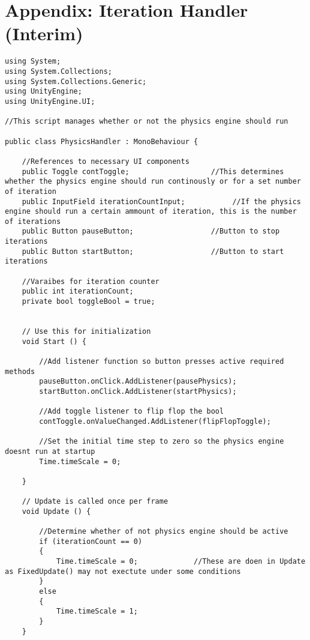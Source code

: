\section{Appendix: Iteration Handler (Interim)}

\begin{mdframed}[linecolor=black, topline=true, bottomline=true,
  leftline=false, rightline=false]
\begin{verbatim}
using System;
using System.Collections;
using System.Collections.Generic;
using UnityEngine;
using UnityEngine.UI;

//This script manages whether or not the physics engine should run

public class PhysicsHandler : MonoBehaviour {

    //References to necessary UI components 
    public Toggle contToggle;                   //This determines whether the physics engine should run continously or for a set number of iteration
    public InputField iterationCountInput;           //If the physics engine should run a certain ammount of iteration, this is the number of iterations
    public Button pauseButton;                  //Button to stop iterations
    public Button startButton;                  //Button to start iterations

    //Varaibes for iteration counter
    public int iterationCount;
    private bool toggleBool = true;


	// Use this for initialization
	void Start () {

        //Add listener function so button presses active required methods
        pauseButton.onClick.AddListener(pausePhysics);
        startButton.onClick.AddListener(startPhysics);

        //Add toggle listener to flip flop the bool
        contToggle.onValueChanged.AddListener(flipFlopToggle);

        //Set the initial time step to zero so the physics engine doesnt run at startup
        Time.timeScale = 0;

	}
	
	// Update is called once per frame
	void Update () {
		
        //Determine whether of not physics engine should be active
        if (iterationCount == 0)
        {
            Time.timeScale = 0;             //These are doen in Update as FixedUpdate() may not exectute under some conditions
        }
        else
        {
            Time.timeScale = 1;
        }
	}


\end{verbatim}
\end{mdframed}
